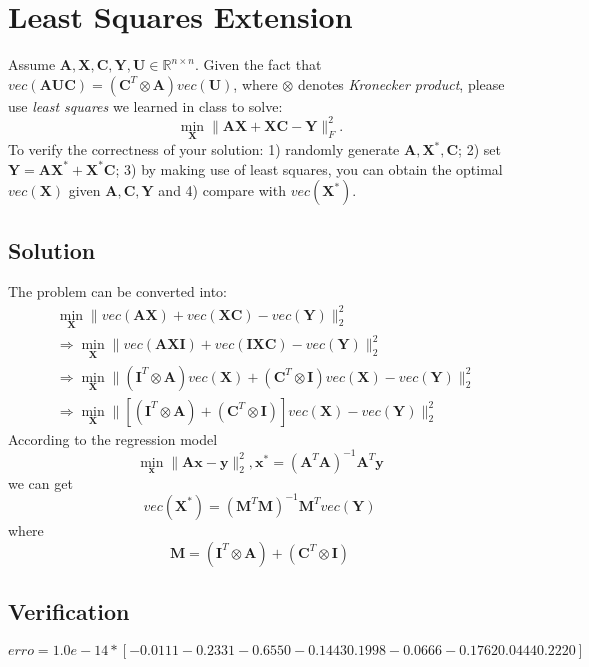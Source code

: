 \documentclass[11pt]{article}
\newcommand{\mfile}[1]  {{\small }} %
\newcommand{\R}{\mathbb{R}}
\newcommand{\maximize}{\operatorname*{maximize}}
\newcommand{\mtx}[1]{\mathbf{#1}}
\newcommand{\vct}[1]{\mathbf{#1}}
\def \mA {\mtx{A}}
\def \mC {\mtx{C}}
\def \mI {\mtx{I}}
\def \mU {\mtx{U}}
\def \mS {\mtx{S}}
\def \mX {\mtx{X}}
\def \mY {\mtx{Y}}
\def \vx {\vct{x}}
\def \vy {\vct{y}}
\def \R {\mathbb{R}}
\begin{document}
\section{Least Squares Extension}
Assume $\mA, \mX, \mC, \mY, \mU \in\R^{n\times n}$. Given the fact that $vec(\mA\mU\mC)=(\mC^T\otimes\mA)vec(\mU)$, where $\otimes$ denotes \textit{Kronecker product}, please use \textit{least squares} we learned in class to solve:
\begin{equation}
	\min_\mX \|\mA\mX+\mX\mC-\mY\|_F^2.
\end{equation}
To verify the correctness of your solution: 1) randomly generate $\mA, \mX^*, \mC$; 2) set $\mY=\mA\mX^*+\mX^*\mC$; 3) by making use of least squares, you can obtain the optimal $vec(\mX)$ given $\mA, \mC, \mY$  and 4) compare with $vec(\mX^*)$.
\subsection{Solution}
The problem can be converted into:
\begin{align*}
	&\min_\mX \|vec(\mA\mX)+vec(\mX\mC)-vec(\mY)\|_2^2\\
	& \Rightarrow\min_\mX \|vec(\mA\mX\mI)+vec(\mI\mX\mC)-vec(\mY)\|_2^2\\
	& \Rightarrow \min_\mX \|(\mI^T\otimes\mA)vec(\mX)+(\mC^T\otimes\mI)vec(\mX)-vec(\mY)\|_2^2\\
	& \Rightarrow \min_\mX \|[(\mI^T\otimes\mA)+(\mC^T\otimes\mI)]vec(\mX)-vec(\mY)\|_2^2
\end{align*} 
According to the regression model 
$$ \min_\vx \|\mA\vx-\vy\|^2_2, \vx^* = (\mA^T\mA)^{-1}\mA^T\vy$$
we can get 
\begin{equation}
	vec(\mX^*) = (\mtx{M}^T\mtx{M})^{-1}\mtx{M}^Tvec(\mY)
\end{equation}
where
$$\mtx{M} =  (\mI^T\otimes\mA)+(\mC^T\otimes\mI)$$
\subsection{Verification}
\mfile{q2.m}
$$erro =
1.0e-14 *[
-0.0111
-0.2331
-0.6550
-0.1443
 0.1998
-0.0666
-0.1762
 0.0444
 0.2220]$$
\vspace{4cm}
\end{document}

